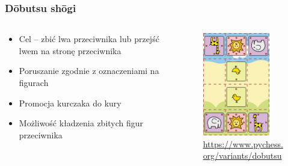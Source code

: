 \documentclass{beamer}
\begin{document}
\begin{frame}
	\frametitle{Dōbutsu shōgi}
	\begin{columns}
		\begin{column}{.48\textwidth}
			\begin{itemize}
				\item Cel -- zbić lwa przeciwnika lub przejść lwem na stronę przeciwnika
				\item Poruszanie zgodnie z oznaczeniami na figurach
				\item Promocja kurczaka do kury
				\item Możliwość kładzenia zbitych figur przeciwnika
			\end{itemize}
		\end{column}%
		\hfill
		\begin{column}{.60\textwidth}
			\begin{figure}
				\includegraphics[height=4.5cm]{dobutsu-shogi.png}
				\centering
				\caption{\url{https://www.pychess.org/variants/dobutsu}}
			\end{figure}
		\end{column}
	\end{columns}
\end{frame}
\end{document}
